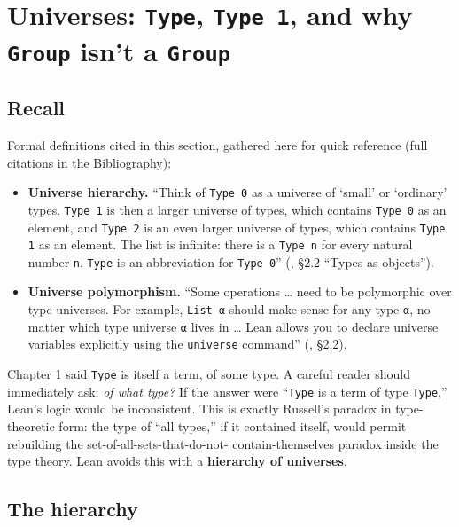 \section{\texorpdfstring{Universes: \texttt{Type}, \texttt{Type\ 1}, and why \texttt{Group} isn't a \texttt{Group}}{Universes: Type, Type 1, and why Group isn't a Group}}\label{sec:05-rigor-check:02-universes:1}

\subsection{Recall}\label{sec:05-rigor-check:02-universes:2}

Formal definitions cited in this section, gathered here for quick reference (full citations in the \hyperref[sec:root:bibliography:1]{Bibliography}):

\begin{itemize}
\tightlist
\item
  \textbf{Universe hierarchy.} ``Think of \texttt{Type 0} as a universe of `small' or `ordinary' types. \texttt{Type 1} is then a larger universe of types, which contains \texttt{Type 0} as an element, and \texttt{Type 2} is an even larger universe of types, which contains \texttt{Type 1} as an element. The list is infinite: there is a \texttt{Type n} for every natural number \texttt{n}. \texttt{Type} is an abbreviation for \texttt{Type 0}'' (\cite{TPIL4}, §2.2 ``Types as objects'').
\item
  \textbf{Universe polymorphism.} ``Some operations \ldots{} need to be polymorphic over type universes. For example, \texttt{List α} should make sense for any type \texttt{α}, no matter which type universe \texttt{α} lives in \ldots{} Lean allows you to declare universe variables explicitly using the \texttt{universe} command'' (\cite{TPIL4}, §2.2).
\end{itemize}

Chapter 1 said \texttt{Type} is itself a term, of some type. A careful reader should immediately ask: \emph{of what type?} If the answer were ``\texttt{Type} is a term of type \texttt{Type},'' Lean's logic would be inconsistent. This is exactly Russell's paradox in type-theoretic form: the type of ``all types,'' if it contained itself, would permit rebuilding the set-of-all-sets-that-do-not- contain-themselves paradox inside the type theory. Lean avoids this with a \textbf{hierarchy of universes}.

\subsection{The hierarchy}\label{sec:05-rigor-check:02-universes:3}

